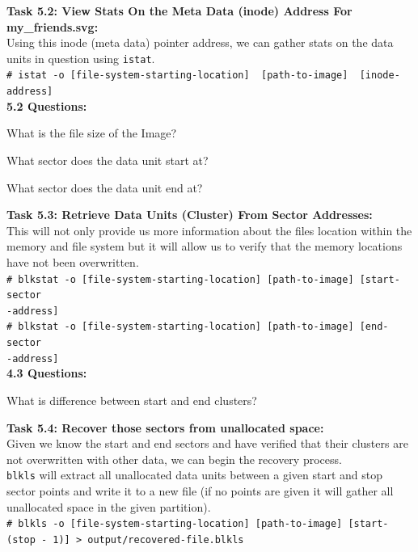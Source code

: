 \documentclass[a4paper,11pt]{article}
\begin{document}
{\noindent
\textbf{Task 5.2: View Stats On the Meta Data (inode) Address For my\_friends.svg:}\\
Using this inode (meta data) pointer address, we can gather stats on the data units in question using \texttt{istat}.\\
\verb|# istat -o [file-system-starting-location]  [path-to-image]  [inode-address]|\\

\noindent
\textbf{5.2 Questions:}
\begin{enumerate*}
	\item What is the file size of the Image?
	\item What sector does the data unit start at?
	\item What sector does the data unit end at?\\
\end{enumerate*}	
}
{\noindent
\textbf{Task 5.3: Retrieve Data Units (Cluster) From Sector Addresses:}\\
This will not only provide us more information about the files location within the memory and file system but it will allow us to verify that the memory locations have not been overwritten.\\
\texttt{{\#} blkstat -o [file-system-starting-location]  [path-to-image]  [start-sector\\-address]}\\
\noindent
\texttt{{\#} blkstat -o [file-system-starting-location]  [path-to-image]  [end-sector\\-address]}\\

\noindent
\textbf{4.3 Questions:}
\begin{enumerate*}
	\item What is difference between start and end clusters?\\
\end{enumerate*}	
}
{\noindent
\textbf{Task 5.4: Recover those sectors from unallocated space:}\\
Given we know the start and end sectors and have verified that their clusters are not overwritten with other data, we can begin the recovery process.\\

\texttt{blkls} will extract all unallocated data units between a given start and stop sector points and write it to a new file (if no points are given it will gather all unallocated space in the given partition). \\

\noindent
\texttt{{\#} blkls -o [file-system-starting-location]  [path-to-image] [start-(stop - 1)] > output/recovered-file.blkls}
}\\
\end{document}
